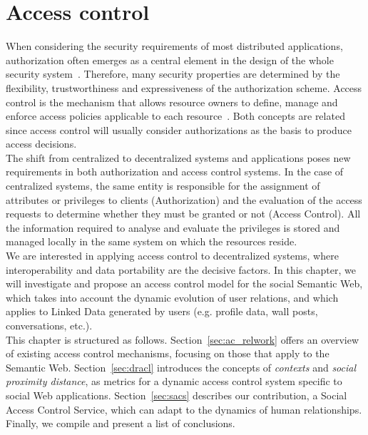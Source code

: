 \chapter{Access control}
\label{ch:ac}
When considering the security requirements of most distributed applications, authorization often emerges as a central element in the design of the whole security system~\cite{woo1998designing}. Therefore, many security properties are determined by the flexibility, trustworthiness and expressiveness of the authorization scheme. Access control is the mechanism that allows resource owners to define, manage and enforce access policies applicable to each resource~\cite{samarati2001access}. Both concepts are related since access control will usually consider authorizations as the basis to produce access decisions.\\

The shift from centralized to decentralized systems and applications poses new requirements in both authorization and access control systems. In the case of centralized systems, the same entity is responsible for the assignment of attributes or privileges to clients (Authorization) and the evaluation of the access requests to determine whether they must be granted or not (Access Control). All the information required to analyse and evaluate the privileges is stored and managed locally in the same system on which the resources reside.\\

We are interested in applying access control to decentralized systems, where interoperability and data portability are the decisive factors. In this chapter, we will investigate and propose an access control model for the social Semantic Web, which takes into account the dynamic evolution of user relations, and which applies to Linked Data generated by users (e.g. profile data, wall posts, conversations, etc.).\\

This chapter is structured as follows. Section~\ref{sec:ac_relwork} offers an overview of existing access control mechanisms, focusing on those that apply to the Semantic Web. Section~\ref{sec:dracl} introduces the concepts of \textit{contexts} and \textit{social proximity distance}, as metrics for a dynamic access control system specific to social Web applications. Section~\ref{sec:sacs} describes our contribution, a Social Access Control Service, which can adapt to the dynamics of human relationships. Finally, we compile and present a list of conclusions.\\

